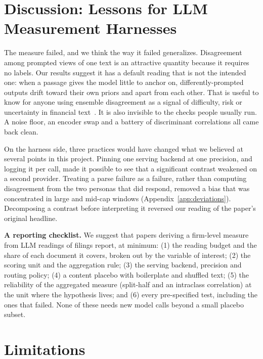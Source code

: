 \documentclass[sigconf,nonacm]{acmart}
\begin{document}
\section{Discussion: Lessons for LLM Measurement Harnesses}
\label{sec:discussion}

The measure failed, and we think the way it failed generalizes. Disagreement among
prompted views of one text is an attractive quantity because it requires no labels. Our
results suggest it has a default reading that is not the intended one: when a passage
gives the model little to anchor on, differently-prompted outputs drift toward their
own priors and apart from each other. That is useful to know for anyone using
ensemble disagreement as a signal of difficulty, risk or uncertainty in financial
text~\cite{kuhn2023semantic}. It is also invisible to the checks people usually run. A
noise floor, an encoder swap and a battery of discriminant correlations all came back
clean.

On the harness side, three practices would have changed what we believed at several
points in this project. Pinning one serving backend at one precision, and logging it
per call, made it possible to see that a significant contrast weakened on a second
provider. Treating a parse failure as a failure, rather than computing disagreement
from the two personas that did respond, removed a bias that was concentrated in large
and mid-cap windows (Appendix~\ref{app:deviations}). Decomposing a contrast before
interpreting it reversed our reading of the paper's original headline.

\textbf{A reporting checklist.} We suggest that papers deriving a firm-level measure
from LLM readings of filings report, at minimum: (1) the reading budget and the share
of each document it covers, broken out by the variable of interest; (2) the scoring
unit and the aggregation rule; (3) the serving backend, precision and routing policy;
(4) a content placebo with boilerplate and shuffled text; (5) the reliability of the
aggregated measure (split-half and an intraclass correlation) at the unit where the
hypothesis lives; and (6) every pre-specified test, including the ones that failed.
None of these needs new model calls beyond a small placebo subset.

\section{Limitations}
\end{document}
